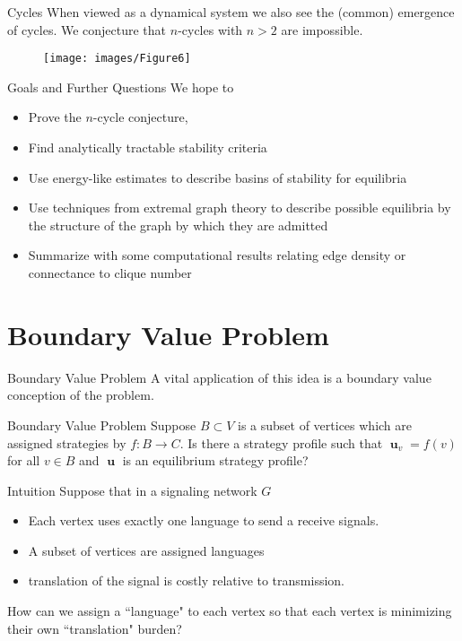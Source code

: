 \documentclass{beamer}
\DeclareMathOperator{\uu}{\mathbf{u}}
\begin{document}
\begin{frame}{Cycles}
	When viewed as a dynamical system we also see the (common) emergence of cycles. We conjecture that $n$-cycles with $n>2$ are impossible. 
	\begin{figure}
	\texttt{[image: images/Figure6]}
	\end{figure} 
\end{frame}

\begin{frame}{Goals and Further Questions}
	We hope to 
	\begin{itemize}
		\item Prove the $n$-cycle conjecture,
		\item Find analytically tractable stability criteria
		\item Use energy-like estimates to describe basins of stability for equilibria
		\item Use techniques from extremal graph theory to describe possible equilibria by the structure of the graph by which they are admitted
		\item Summarize with some computational results relating edge density or connectance to clique number 
	\end{itemize}
\end{frame}


\section{Boundary Value Problem}
\begin{frame}{Boundary Value Problem}
	A vital application of this idea is a boundary value conception of the problem.
	\begin{block}{Boundary Value Problem}
		Suppose $B\subset V$ is a subset of vertices which are assigned strategies by $f:B\rightarrow C$. Is there a strategy profile such that $\uu_v=f(v)$ for all $v\in B$ and $\uu$ is an equilibrium strategy profile?
	\end{block}
\end{frame}
\begin{frame}{Intuition}
	Suppose that in  a signaling network $G$
	\begin{itemize}
		\item Each vertex uses exactly one language to send a receive signals. 
		\item A subset of vertices are assigned languages
		\item translation of the signal is costly relative to transmission. 
	\end{itemize}

	How can we assign a ``language" to each vertex so that each vertex is minimizing their own ``translation" burden?
\end{frame}
\end{document}
